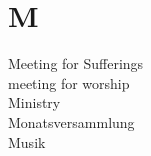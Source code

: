 \section*{M}

\articlesize

\begin{description}
 \item[Meeting for Sufferings]
 \item[meeting for worship]
 \item[Ministry]
 \item[Monatsversammlung]
 \item[Musik]
 \end{description}

\normalsize
